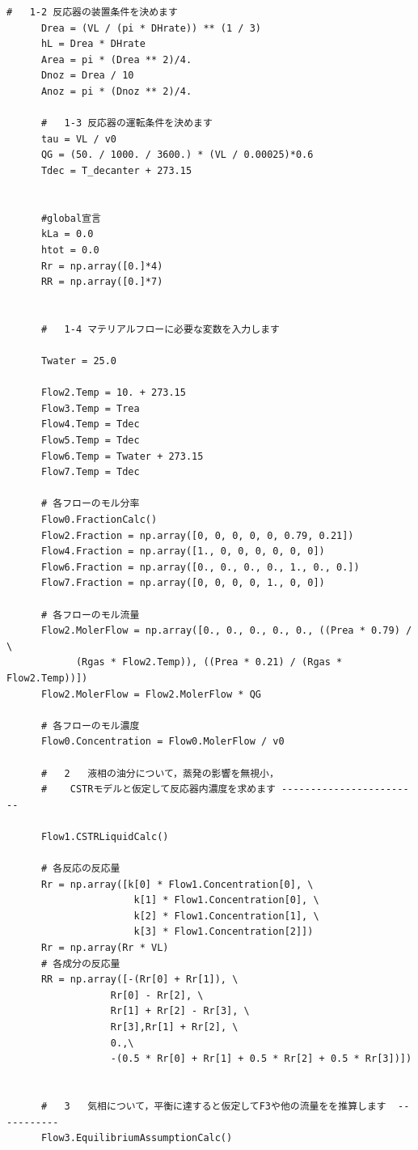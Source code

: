 \documentclass[a4j]{jsreport}
\begin{document}
\begin{lstlisting}[caption=気液反応器の解析(迅速に平衡)]
      #   1-2 反応器の装置条件を決めます
      Drea = (VL / (pi * DHrate)) ** (1 / 3)
      hL = Drea * DHrate
      Area = pi * (Drea ** 2)/4.
      Dnoz = Drea / 10
      Anoz = pi * (Dnoz ** 2)/4.

      #   1-3 反応器の運転条件を決めます
      tau = VL / v0
      QG = (50. / 1000. / 3600.) * (VL / 0.00025)*0.6
      Tdec = T_decanter + 273.15


      #global宣言
      kLa = 0.0
      htot = 0.0
      Rr = np.array([0.]*4)
      RR = np.array([0.]*7)


      #   1-4 マテリアルフローに必要な変数を入力します

      Twater = 25.0

      Flow2.Temp = 10. + 273.15
      Flow3.Temp = Trea
      Flow4.Temp = Tdec
      Flow5.Temp = Tdec
      Flow6.Temp = Twater + 273.15
      Flow7.Temp = Tdec

      # 各フローのモル分率
      Flow0.FractionCalc()
      Flow2.Fraction = np.array([0, 0, 0, 0, 0, 0.79, 0.21])
      Flow4.Fraction = np.array([1., 0, 0, 0, 0, 0, 0])
      Flow6.Fraction = np.array([0., 0., 0., 0., 1., 0., 0.])
      Flow7.Fraction = np.array([0, 0, 0, 0, 1., 0, 0])

      # 各フローのモル流量
      Flow2.MolerFlow = np.array([0., 0., 0., 0., 0., ((Prea * 0.79) / \
            (Rgas * Flow2.Temp)), ((Prea * 0.21) / (Rgas * Flow2.Temp))])
      Flow2.MolerFlow = Flow2.MolerFlow * QG

      # 各フローのモル濃度
      Flow0.Concentration = Flow0.MolerFlow / v0

      #   2   液相の油分について，蒸発の影響を無視小，
      #    CSTRモデルと仮定して反応器内濃度を求めます ------------------------

      Flow1.CSTRLiquidCalc()

      # 各反応の反応量
      Rr = np.array([k[0] * Flow1.Concentration[0], \
                      k[1] * Flow1.Concentration[0], \
                      k[2] * Flow1.Concentration[1], \
                      k[3] * Flow1.Concentration[2]])
      Rr = np.array(Rr * VL)
      # 各成分の反応量
      RR = np.array([-(Rr[0] + Rr[1]), \
                  Rr[0] - Rr[2], \
                  Rr[1] + Rr[2] - Rr[3], \
                  Rr[3],Rr[1] + Rr[2], \
                  0.,\
                  -(0.5 * Rr[0] + Rr[1] + 0.5 * Rr[2] + 0.5 * Rr[3])])


      #   3   気相について，平衡に達すると仮定してF3や他の流量をを推算します  -----------
      Flow3.EquilibriumAssumptionCalc()



\end{lstlisting}
\end{document}
